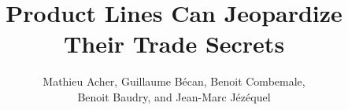 \documentclass{sig-alternate}
\begin{document}
%

\title{Product Lines Can Jeopardize Their Trade Secrets}
%
%
%
%
%

%
\author{
%
%
\alignauthor
Mathieu Acher, Guillaume B\'{e}can, Benoit Combemale,\\ Benoit Baudry, and Jean-Marc J\'{e}z\'{e}quel\\
        \fi
        \fi
}
\end{document}
